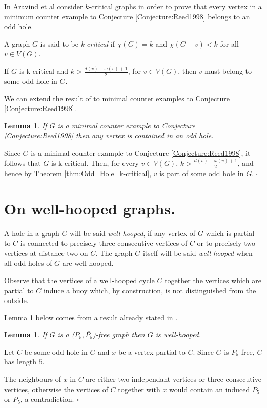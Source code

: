 \documentclass{amsart}
\newtheorem{lem}[thm]{Lemma}
\theoremstyle{definition}
\theoremstyle{remark}
\newenvironment{prf}{{\bf \noindent Proof. } }{\hfill$\square$\\}
\newcommand{\Wh}{well-hooped\xspace}
\newcommand{\wh}{well-hooped\xspace}
\newcommand{\extB}{buoy\xspace}
\begin{document}
In \cite{AraKarSub2011} Aravind et al consider $k$-critical graphs in order to prove that every vertex in a minimum counter example to Conjecture \ref{Conjecture:Reed1998} belongs to an odd hole.

A graph $G$ is said to be {\em k-critical} if $\chi(G)=k$ and $\chi(G-v)<k$ for all $v\in V(G)$.

\begin{thm}\cite{AraKarSub2011}\label{thm:Odd_Hole_k-critical}
If $G$ is k-critical and $k > \frac{d(v)+\omega(v)+1}{2}$, for $v\in V(G)$, then $v$ must belong to some odd hole in $G$.
\end{thm}

We can extend the result of \cite{AraKarSub2011} to minimal counter examples to Conjecture \ref{Conjecture:Reed1998}.
\begin{lem} \label{Lemme:Hole} 
If $G$ is a minimal counter example to Conjecture \ref{Conjecture:Reed1998} then any vertex is contained in an odd hole.
\end{lem}
\begin{prf}
 Since $G$ is a minimal counter example to Conjecture \ref{Conjecture:Reed1998}, it follows that $G$ is k-critical. Then, for every $v\in V(G)$, $k > \frac{d(v)+\omega(v)+1}{2}$, 
and hence by Theorem \ref{thm:Odd_Hole_k-critical}, $v$ is part of some odd hole in $G$.
\end{prf}


\section{On \Wh graphs.}


A hole in a graph $G$ will be said {\em \Wh}, if any vertex of $G$ which is partial to $C$ is connected to precisely three consecutive vertices of $C$ or to  precisely two vertices at distance two on $C$. The graph $G$ itself 
will be said {\em \Wh} when all odd holes of $G$ are \Wh.

Observe that the vertices of a \wh cycle $C$ together the vertices which are partial to $C$ induce a \extB which, by construction, is not distinguished from the outside.



Lemma \ref{lem:P5etLeurComplémentsSontStroumpfs} below comes from a result already stated in \cite{FouGiaMaiThu1995}.
\begin{lem}\label{lem:P5etLeurComplémentsSontStroumpfs}
If $G$ is a ($P_5,\overline{P_5}$)-free graph then $G$ is \wh.
\end{lem}
\begin{prf}
Let $C$ be some odd hole in $G$ and $x$ be a vertex partial to $C$. Since $G$ is $P_5$-free, $C$ has length $5$.

The neighbours of $x$ in $C$ are either two independant vertices or three consecutive vertices, otherwise the vertices of $C$ together with $x$ would contain an induced $P_5$ or $\overline{P_5}$, a contradiction.
\end{prf}
\end{document}
